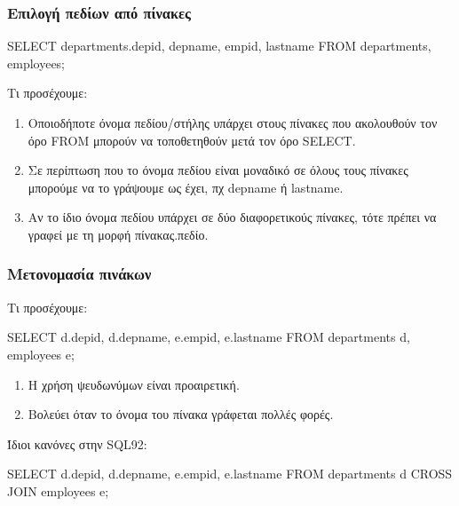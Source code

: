 \begin{frame}
\frametitle{Επιλογή πεδίων από πίνακες}
\begin{minipage}{\wE}
\en
\begin{SQL}
  SELECT departments.depid, depname, empid, lastname 
    FROM departments, employees;
\end{SQL}
\el
\begin{block}{Τι προσέχουμε:}
\begin{enumerate}
  \item Οποιοδήποτε όνομα πεδίου/στήλης υπάρχει στους πίνακες που ακολουθούν τον όρο {\sq FROM}
        μπορούν να τοποθετηθούν μετά τον όρο {\sq SELECT}.
  \item Σε περίπτωση που το όνομα πεδίου είναι μοναδικό σε όλους τους πίνακες 
        μπορούμε να το γράψουμε ως έχει, πχ {\ra depname} ή {\ra lastname}.
  \item Αν το ίδιο όνομα πεδίου υπάρχει σε δύο διαφορετικούς πίνακες,
        τότε πρέπει να γραφεί με τη μορφή {\sq\el πίνακας.πεδίο}.
\end{enumerate} 
\end{block} 
\end{minipage}
\end{frame}


\begin{frame}
\frametitle{Μετονομασία πινάκων}
\begin{minipage}{\wE}
\begin{block}{Τι προσέχουμε:}
\en
\begin{SQL}
  SELECT d.depid, d.depname, e.empid, e.lastname 
    FROM departments d, employees e;
\end{SQL}
\el
\begin{enumerate}
  \item Η χρήση ψευδωνύμων είναι προαιρετική.
  \item Βολεύει όταν το όνομα του πίνακα γράφεται πολλές φορές.
\end{enumerate} 
\end{block}
\pause
\begin{block}{Ίδιοι κανόνες στην {\en SQL92}:}
\en
\begin{SQL}
  SELECT d.depid, d.depname, e.empid, e.lastname 
    FROM departments d CROSS JOIN employees e;
\end{SQL}
\el
\end{block}
\end{minipage}
\end{frame}




